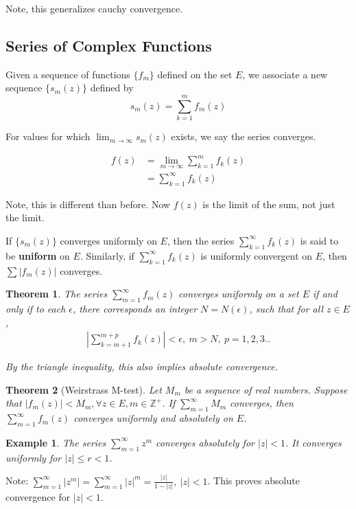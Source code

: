 \documentclass{article}
\newtheorem{theorem}{Theorem}[section]
\newtheorem{ex}{Example}
\theoremstyle{definition}
\begin{document}
Note, this generalizes cauchy convergence. 



\subsection{Series of Complex Functions}
Given a sequence of functions $\{f_m\}$ defined on the set $E$, we associate a new sequence $\{s_m(z)\}$ defined by 
$$s_m(z) = \sum_{k=1}^m f_m(z)$$

For values for which  $\lim_{m \to \infty }s_m(z)$ exists, we say the series converges. 

\begin{align}
f(z) &= \lim_{m \to \infty } \sum_{k=1}^m f_k(z) \\ 
& = \sum_{k=1}^\infty f_k(z)
\end{align}

Note, this is different than before. Now $f(z)$ is the limit of the sum, not just the limit.

If $\{s_m(z)\}$ converges uniformly on $E$, then the series $\sum_{k=1}^\infty f_k(z)$ is said to be \textbf{uniform} on $E$. Similarly, if $\sum_{k=1}^\infty f_k(z)$ is uniformly convergent on $E$, then
$\sum\left|f_m(z)\right|$ converges. 

\begin{theorem}
The series $\sum_{m=1}^\infty f_m(z)$ converges uniformly on a set $E$ if and only if to each $\epsilon$, there corresponds an integer $N = N(\epsilon)$, such that for all $z \in E$, 
\begin{align}
\left|\sum_{k=m+1}^{m+p}f_k(z) \right| < \epsilon,\ m>N,\ p = 1,2,3..
\end{align}


By the triangle inequality, this also implies absolute convergence. 
\end{theorem}

\begin{theorem}[Weirstrass M-test]
Let $M_m$ be a sequence of real numbers. Suppose that $|f_m(z)| < M_m, \forall z \in E, m\in \mathbb{Z}^+$.  If $\sum_{m=1}^\infty M_m$ converges, then $\sum_{m=1}^\infty f_m(z)$ converges uniformly and absolutely on $E$. 
\end{theorem}
\begin{ex}
The series $\sum_{m=1}^\infty z^m $ converges absolutely for $|z|<1$. It converges uniformly for $|z|\leq r < 1$. 
\end{ex}

Note: $\sum_{m=1}^\infty |z^m| = \sum_{m=1}^\infty |z|^m = \frac{|z|}{1-|z|},\ |z|<1$. This proves absolute convergence for $|z|<1$. 
\end{document}
